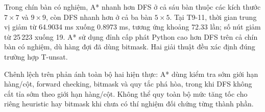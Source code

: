 Trong chín bàn có nghiệm, A* nhanh hơn DFS ở cả sáu bàn thuộc
các kích thước $7\times7$ và $9\times9$, còn DFS nhanh hơn ở cả
ba bàn $5\times5$. Tại T9-11, thời gian trung vị giảm từ
64.9034 ms xuống 0.8973 ms, tương ứng khoảng 72.33 lần; số nút
giảm từ 25\,223 xuống 19. A* sử dụng đỉnh cấp phát Python cao hơn
DFS trên cả chín bàn có nghiệm, dù hàng đợi đã dùng bitmask.
Hai giải thuật đều xác định đúng trường hợp T-unsat.

Chênh lệch trên phản ánh toàn bộ hai hiện thực: A* dùng kiểm tra
sớm giới hạn hàng/cột, forward checking, bitmask và quy tắc phá
hòa, trong khi DFS không cắt tỉa sớm theo giới hạn hàng/cột.
Không thể quy toàn bộ mức tăng tốc cho riêng heuristic hay
bitmask khi chưa có thí nghiệm đối chứng từng thành phần.
